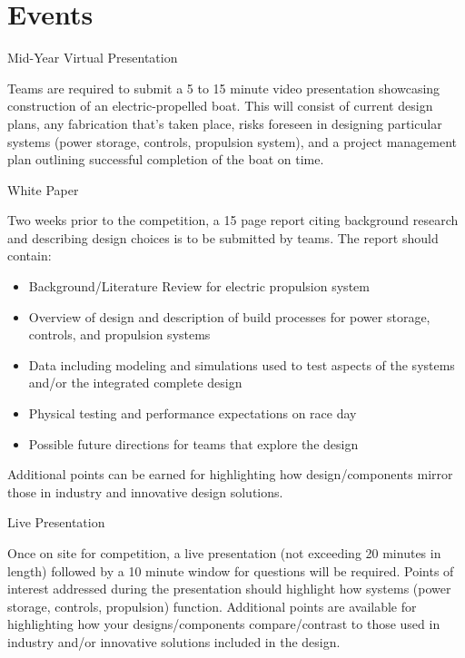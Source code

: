 \documentclass{article}
\begin{document}
\section{Events}
\begin{description}
    \item[Mid-Year Virtual Presentation]
\end{description}
Teams are required to submit a 5 to 15 minute video presentation showcasing construction of an electric-propelled boat. This will consist of current design plans, any fabrication that's taken place, risks foreseen in designing particular systems (power storage, controls, propulsion system), and a project management plan outlining successful completion of the boat on time.
\begin{description}
    \item[White Paper]
\end{description}
Two weeks prior to the competition, a 15 page report citing background research and describing design choices is to be submitted by teams. The report should contain:
    \begin{itemize}
    \item Background/Literature Review for electric propulsion system 
    \item Overview of design and description of build processes for power storage, controls, and propulsion systems 
    \item Data including modeling and simulations used to test aspects of the systems and/or the integrated complete design
    \item Physical testing and performance expectations on race day 
    \item Possible future directions for teams that explore the design
    \end{itemize}
Additional points can be earned for highlighting how design/components mirror those in industry and innovative design solutions.
\begin{description}
    \item[Live Presentation]
\end{description}
Once on site for competition, a live presentation (not exceeding 20 minutes in length) followed by a 10 minute window for questions will be required. Points of interest addressed during the presentation should highlight how systems (power storage, controls, propulsion) function. Additional points are available for highlighting how your designs/components compare/contrast to those used in industry and/or innovative solutions included in the design. 
\end{document}
